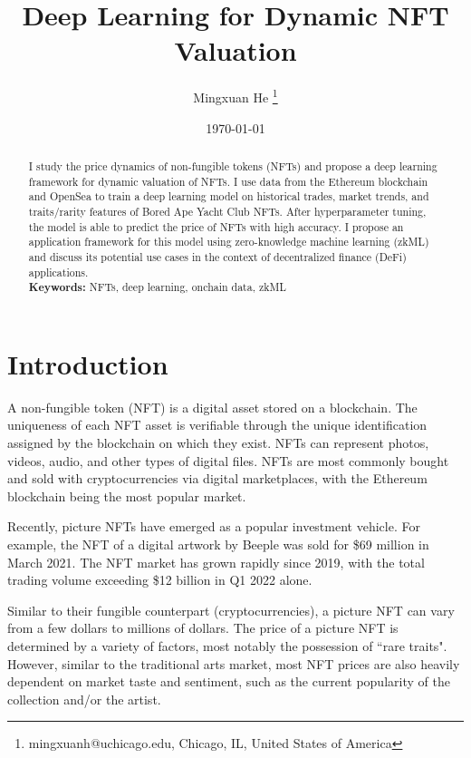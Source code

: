 \documentclass[12pt]{article}
\begin{document}
\title{Deep Learning for Dynamic NFT Valuation}


\author{Mingxuan He
    \thanks{mingxuanh@uchicago.edu, Chicago, IL, United States of America}}
\date{\today}


\maketitle 


\begin{abstract}
    I study the price dynamics of non-fungible tokens (NFTs) and propose a deep learning framework for dynamic valuation of NFTs. I use data from the Ethereum blockchain and OpenSea to train a deep learning model on historical trades, market trends, and traits/rarity features of Bored Ape Yacht Club NFTs. After hyperparameter tuning, the model is able to predict the price of NFTs with high accuracy. I propose an application framework for this model using zero-knowledge machine learning (zkML) and discuss its potential use cases in the context of decentralized finance (DeFi) applications.\\

    \textbf{Keywords:} NFTs, deep learning, onchain data, zkML

\end{abstract} 



\section{Introduction}
\label{sec: introduction}
A non-fungible token (NFT) is a digital asset stored on a blockchain. The uniqueness of each NFT asset is verifiable through the unique identification assigned by the blockchain on which they exist.
NFTs can represent photos, videos, audio, and other types of digital files. NFTs are most commonly bought and sold with cryptocurrencies via digital marketplaces, with the Ethereum blockchain being the most popular market.

Recently, picture NFTs have emerged as a popular investment vehicle. For example, the NFT of a digital artwork by Beeple was sold for \$69 million in March 2021. The NFT market has grown rapidly since 2019, with the total trading volume exceeding \$12 billion in Q1 2022 alone.

Similar to their fungible counterpart (cryptocurrencies), a picture NFT can vary from a few dollars to millions of dollars. The price of a picture NFT is determined by a variety of factors, most notably the possession of ``rare traits". However, similar to the traditional arts market, most NFT prices are also heavily dependent on market taste and sentiment, such as the current popularity of the collection and/or the artist.
\end{document}
